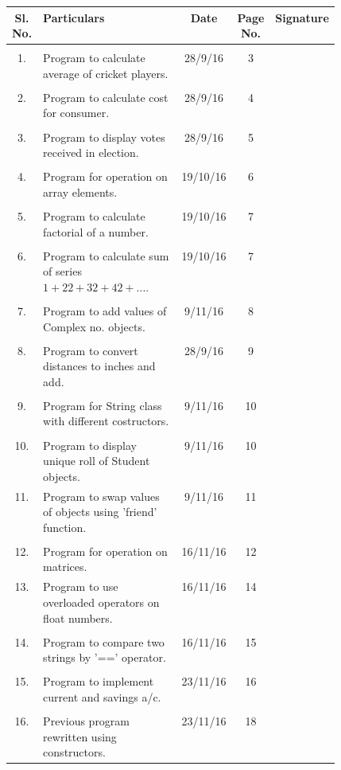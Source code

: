 \documentclass[a4paper,11pt]{article}
\begin{document}
\begin{tabular}{|c|p{0.48\linewidth}|c|c|c|}
\textbf{Sl. No.}&\textbf{Particulars}&\textbf{Date}&\textbf{Page No.}&\textbf{Signature}\\[5pt] \hline
\\1.&Program to calculate average of cricket players.& 28/9/16 & 3 &\\ \hline
\\2.&Program to calculate cost for consumer.& 28/9/16 & 4 &\\ \hline
\\3.&Program to display votes received in election.& 28/9/16 & 5 &\\ \hline
\\4.&Program for operation on array elements.& 19/10/16 & 6 &\\ \hline
\\5.&Program to calculate factorial of a number.& 19/10/16 & 7 &\\ \hline
\\6.&Program to calculate sum of series$1+22+32+42+...$.& 19/10/16 & 7 &\\ \hline
\\7.&Program to add values of Complex no. objects.& 9/11/16 & 8 &\\ \hline
\\8.&Program to convert distances to inches and add.& 28/9/16 & 9 &\\ \hline
\\9.&Program for String class with different costructors.& 9/11/16 & 10 &\\ \hline
\\10.&Program to display unique roll of Student objects.& 9/11/16 & 10 &\\ \hline
11.&Program to swap values of objects using 'friend' function.& 9/11/16 & 11 &\\ \hline
\\12.&Program for operation on matrices.& 16/11/16 & 12 &\\ \hline
13.&Program to use overloaded operators on float numbers.& 16/11/16 & 14 &\\ \hline
\\14.&Program to compare two strings by '==' operator.& 16/11/16 & 15 &\\ \hline
\\15.&Program to implement current and savings a/c.& 23/11/16 & 16 &\\ \hline
\\16.&Previous program rewritten using constructors.& 23/11/16 & 18 &\\ \hline

\end{tabular}
\end{document}
